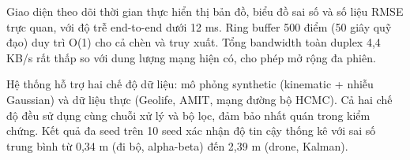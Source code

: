 Giao diện theo dõi thời gian thực hiển thị bản đồ, biểu đồ sai số và số liệu RMSE trực quan, với độ trễ end-to-end dưới 12 ms. Ring buffer 500 điểm (50 giây quỹ đạo) duy trì O(1) cho cả chèn và truy xuất. Tổng bandwidth toàn duplex 4,4 KB/s rất thấp so với dung lượng mạng hiện có, cho phép mở rộng đa phiên.

Hệ thống hỗ trợ hai chế độ dữ liệu: mô phỏng synthetic (kinematic + nhiễu Gaussian) và dữ liệu thực (Geolife, AMIT, mạng đường bộ HCMC). Cả hai chế độ đều sử dụng cùng chuỗi xử lý và bộ lọc, đảm bảo nhất quán trong kiểm chứng. Kết quả đa seed trên 10 seed xác nhận độ tin cậy thống kê với sai số trung bình từ 0,34 m (đi bộ, alpha-beta) đến 2,39 m (drone, Kalman).
